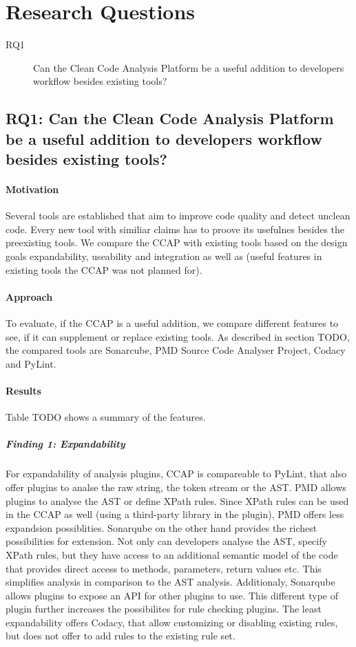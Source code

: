 \section{Research Questions}

\begin{description}
    \item[RQ1] Can the Clean Code Analysis Platform be a useful addition to developers workflow besides existing tools? 
\end{description}

\subsection{RQ1: Can the Clean Code Analysis Platform be a useful addition to developers workflow besides existing tools?}
\paragraph{Motivation}
Several tools are established that aim to improve code quality and detect unclean code. Every new tool with similiar claims has to proove its usefulnes besides the preexisting tools. We compare the CCAP with existing tools based on the design goals expandability, useability and integration as well as (useful features in existing tools the CCAP was not planned for).
\paragraph{Approach}
To evaluate, if the CCAP is a useful addition, we compare different features to see, if it can supplement or replace existing tools. As described in section TODO, the compared tools are Sonarcube, PMD Source Code Analyser Project, Codacy and PyLint.

\paragraph{Results}
Table TODO shows a summary of the features.

\subparagraph{Finding 1: Expandability}
For expandability of analysis plugins, CCAP is compareable to PyLint, that also offer plugins to analse the raw string, the token stream or the AST. PMD allows plugins to analyse the AST or define XPath rules. Since XPath rules can be used in the CCAP as well (using a third-party library in the plugin), PMD offers less expandsion possiblities. Sonarqube on the other hand provides the richest possibilities for extension. Not only can developers analyse the AST, specify XPath rules, but they have access to an additional semantic model of the code that provides direct access to methods, parameters, return values etc. This simplifies analysis in comparison to the AST analysis. Additionaly, Sonarqube allows plugins to expose an API for other plugins to use. This different type of plugin further increases the possibilites for rule checking plugins. The least expandability offers Codacy, that allow customizing or disabling existing rules, but does not offer to add rules to the existing rule set.


